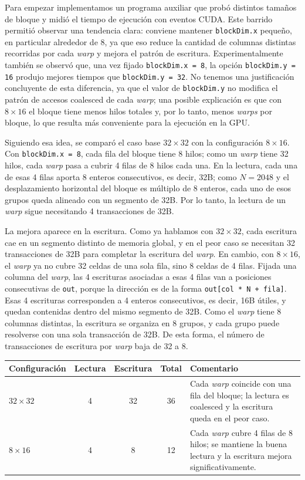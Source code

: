 \documentclass[10pt,a4paper]{article}
\begin{document}
 Para empezar implementamos un programa auxiliar que probó distintos tamaños de bloque y midió el tiempo de ejecución con eventos CUDA. Este barrido permitió observar una tendencia clara: conviene mantener \texttt{blockDim.x} pequeño, en particular alrededor de 8, ya que eso reduce la cantidad de columnas distintas recorridas por cada \emph{warp} y mejora el patrón de escritura. Experimentalmente también se observó que, una vez fijado \texttt{blockDim.x = 8}, la opción \texttt{blockDim.y = 16} produjo mejores tiempos que \texttt{blockDim.y = 32}. No tenemos una justificación concluyente de esta diferencia, ya que el valor de \texttt{blockDim.y} no modifica el patrón de accesos coalesced de cada \emph{warp}; una posible explicación es que con \(8\times 16\) el bloque tiene menos hilos totales y, por lo tanto, menos \emph{warps} por bloque, lo que resulta más conveniente para la ejecución en la GPU.

Siguiendo esa idea, se comparó el caso base $32\times 32$ con la configuración $8\times 16$. Con \texttt{blockDim.x = 8}, cada fila del bloque tiene 8 hilos; como un \emph{warp} tiene 32 hilos, cada \emph{warp} pasa a cubrir 4 filas de 8 hilos cada una. En la lectura, cada una de esas 4 filas aporta 8 enteros consecutivos, es decir, 32B; como $N=2048$ y el desplazamiento horizontal del bloque es múltiplo de 8 enteros, cada uno de esos grupos queda alineado con un segmento de 32B. Por lo tanto, la lectura de un \emph{warp} sigue necesitando 4 transacciones de 32B.

La mejora aparece en la escritura. Como ya hablamos con $32\times 32$, cada escritura cae en un segmento distinto de memoria global, y en el peor caso se necesitan 32 transacciones de 32B para completar la escritura del \emph{warp}. En cambio, con $8\times 16$, el \emph{warp} ya no cubre 32 celdas de una sola fila, sino 8 celdas de 4 filas. Fijada una columna del \emph{warp}, las 4 escrituras asociadas a esas 4 filas van a posiciones consecutivas de \texttt{out}, porque la dirección es de la forma \texttt{out[col * N + fila]}. Esas 4 escrituras corresponden a 4 enteros consecutivos, es decir, 16B útiles, y quedan contenidas dentro del mismo segmento de 32B. Como el \emph{warp} tiene 8 columnas distintas, la escritura se organiza en 8 grupos, y cada grupo puede resolverse con una sola transacción de 32B. De esta forma, el número de transacciones de escritura por \emph{warp} baja de 32 a 8.


\begin{center}
\small
\begin{tabular}{>{\raggedright\arraybackslash}p{2.5cm}ccc>{\raggedright\arraybackslash}p{6.2cm}}
\toprule
Configuración & Lectura & Escritura & Total & Comentario \\
\midrule
$32\times 32$ & 4 & 32 & 36 & Cada \emph{warp} coincide con una fila del bloque; la lectura es coalesced y la escritura queda en el peor caso. \\
$8\times 16$ & 4 & 8 & 12 & Cada \emph{warp} cubre 4 filas de 8 hilos; se mantiene la buena lectura y la escritura mejora significativamente. \\
\bottomrule
\end{tabular}
\end{center}
\end{document}
